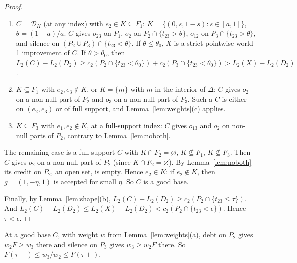 \documentclass[11pt]{article}
\theoremstyle{definition}\newtheorem{definition}[theorem]{Definition}
\theoremstyle{remark}\newtheorem{remark}[theorem]{Remark}
\newcommand{\Dscr}{\mathcal D}
\begin{document}
\begin{proof}
\begin{enumerate}[label=(\roman*),leftmargin=*,itemsep=2pt]
$C=E_2(b')$ with $b'<\beta_0$ is also impossible. The two models differ on
\begin{gather*}
 J=P_1\cap\{b'\le t_{12}<\beta_0\},\qquad
 A=P_2\cap\{b'\le t_{12}<\beta_0,\ t_{23}\ge\theta_0\},\\
 A'=P_2\cap\{t_{23}<\theta_0,\ t_{12}<b'\}.
\end{gather*}
$L(C)\le L(X)$ reads (I) $c_2(J)+c_2(A)-c_2(A')\le0$ and (II)
$c_3(J)+u(A')-u(A)\le0$. By (II), $u(A)>u(A')$. $F$ is nondecreasing and
$t_{23}$ is smaller on $A'$ than on $A$, so
$c_2(A)-c_2(A')\ge\lambda(u(A)-u(A'))\ge0$ with
$\lambda=\operatorname{ess\,sup}_{A'}F(t_{23})$. Then (I) fails.
\item $C=\Dscr_K$ (at any index) with $e_2\in K\subseteq F_1$:
$K=\{(0,s,1-s):s\in[a,1]\}$,
$\theta=(1-a)/a$. $C$ gives $o_{23}$ on $P_1$, $o_2$ on
$P_2\cap\{t_{23}>\theta\}$, $o_{12}$ on $P_3\cap\{t_{23}>\theta\}$, and silence
on $(P_2\cup P_3)\cap\{t_{23}<\theta\}$. If $\theta\le\theta_0$, $X$ is a
strict pointwise world-1 improvement of $C$. If $\theta>\theta_0$, then
$L_2(C)-L_2(D_2)\ge c_2(P_2\cap\{t_{23}<\theta_0\})+c_2(P_3\cap\{t_{23}<\theta_0\})
>L_2(X)-L_2(D_2)$.
\item $K\subseteq F_1$ with $e_2,e_3\notin K$, or $K=\{m\}$ with $m$ in the
interior of $\Delta$: $C$ gives $o_2$ on a non-null part of $P_2$ and $o_3$ on a non-null
part of $P_3$. Such a $C$ is either on $(e_2,e_3)$ or of full support, and
Lemma~\ref{lem:weights}(c) applies.
\item $K\subseteq F_3$ with $e_1,e_2\notin K$, at a full-support index: $C$
gives $o_{13}$ and $o_2$ on non-null parts of $P_2$, contrary to
Lemma~\ref{lem:noboth}.
\end{enumerate}
The remaining case is a full-support $C$ with $K\cap F_2=\varnothing$,
$K\not\subseteq F_1$, $K\not\subseteq F_3$. Then $C$ gives $o_2$ on a non-null
part of $P_2$ (since $K\cap F_2=\varnothing$). By Lemma~\ref{lem:noboth} its
credit on $P_2$, an open set, is empty. Hence $e_2\in K$: if $e_2\notin K$,
then $g=(1,-\eta,1)$ is accepted for small $\eta$. So $C$ is a good base.

Finally, by Lemma~\ref{lem:shape}(b),
$L_2(C)-L_2(D_2)\ge c_2(P_2\cap\{t_{23}\le\tau\})$. And
$L_2(C)-L_2(D_2)\le L_2(X)-L_2(D_2)<c_2(P_2\cap\{t_{23}<\epsilon\})$. Hence
$\tau<\epsilon$.
\end{proof}

At a good base $C$, with weight $w$ from Lemma~\ref{lem:weights}(a), debt on
$P_2$ gives $w_2F\ge w_3$ there and silence on $P_3$ gives $w_3\ge w_2F$ there.
So $F(\tau-)\le w_3/w_2\le F(\tau+)$.
\end{document}
